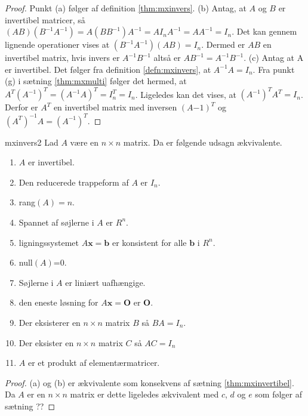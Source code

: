 %
%
\begin{proof}
Punkt (a) følger af definition \ref{thm:mxinvers}. 
(b) Antag, at $A$ og $B$ er invertibel matricer, så $(AB)(B^{-1}A^{-1})=A(BB^{-1})A^{-1}=AI_nA^{-1}=AA^{-1}=I_n$. 
Det kan gennem lignende operationer vises at $(B^{-1}A^{-1})(AB)=I_n$.
Dermed er $AB$ en invertibel matrix, hvis invers er $A^{-1}B^{-1}$ altså er $AB^{-1}=A^{-1}B^{-1}$.
(c) Antag at A er invertibel. 
Det følger fra definition \ref{defn:mxinvers}, at $A^{-1}A=I_n$. 
Fra punkt (g) i sætning \ref{thm:mxmulti} følger det hermed, at $A^T(A^{-1})^T=(A^{-1}A)^T=I_n^T=I_n$. 
Ligeledes kan det vises, at $(A^{-1})^TA^T=I_n$. 
Derfor er $A^T$ en invertibel matrix med inversen $(A{-1})^T$ og $(A^T)^{-1}A=(A^{-1})^T$.
\end{proof}
%
%
\begin{thm}{}{mxinvers2}
Lad $A$ være en $n \times n$ matrix. 
Da er følgende udsagn ækvivalente.
\begin{enumerate}[label=(\alph*)]
\item $A$ er invertibel.
\item Den reducerede trappeform af $A$ er $I_n$.
\item rang$(A)=n$.
\item Spannet af søjlerne i $A$ er $R^n$.
\item ligningssystemet $A\textbf{x}=\textbf{b}$ er konsistent for alle $\textbf{b}$ i $R^n$.
\item null$(A)$=0.
\item Søjlerne i $A$ er liniært uafhængige.
\item den eneste løsning for $A\textbf{x}=\textbf{O}$ er $\textbf{O}$.
\item Der eksisterer en $n \times n$ matrix $B$ så $BA=I_n$.
\item Der eksister en $n \times n$ matrix $C$ så $AC=I_n$
\item $A$ er et produkt af elementærmatricer.

\end{enumerate}
\end{thm}
\begin{proof}
(a) og (b) er ækvivalente som konsekvens af sætning \ref{thm:mxinvertibel}. Da $A$ er en $n \times n$ matrix er dette ligeledes ækvivalent med $c$, $d$ og $e$ som følger af sætning ??
\end{proof}
